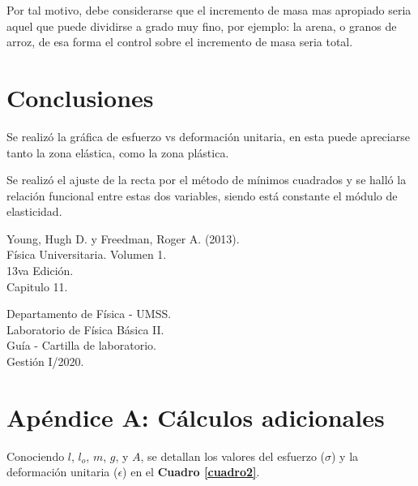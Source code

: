 \documentclass[letter,11pt]{article}
\begin{document}
Por tal motivo, debe considerarse que el incremento de masa mas apropiado seria
aquel que puede dividirse a grado muy fino, por ejemplo: la arena, o granos de
arroz, de esa forma el control sobre el incremento de masa seria total.

\section{Conclusiones}

Se realizó la gráfica de esfuerzo vs deformación unitaria, en esta puede
apreciarse tanto la zona elástica, como la zona plástica.

Se realizó el ajuste de la recta por el método de mínimos cuadrados y se halló
la relación funcional entre estas dos variables, siendo está constante el
módulo de elasticidad.

\begin{thebibliography}{99}

 Young, Hugh D. y Freedman, Roger A. (2013).\\
Física Universitaria. Volumen 1.\\
13va Edición.\\
Capitulo 11.

 Departamento de Física - UMSS.\\
Laboratorio de Física Básica II.\\
Guía - Cartilla de laboratorio.\\
Gestión I/2020.

\end{thebibliography}

\newpage
\section*{Apéndice A: Cálculos adicionales}

Conociendo $l$, $l_o$, $m$, $g$, y $A$, se detallan los valores del esfuerzo
($\sigma$) y la deformación unitaria ($\epsilon$) en el
\textbf{Cuadro \ref{cuadro2}}.
\end{document}
